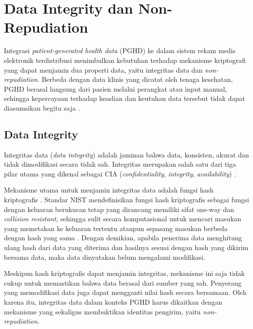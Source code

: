 \section{Data Integrity dan Non-Repudiation}\label{studi-data-integrity-non-repudiation}

Integrasi \textit{patient-generated health data} (PGHD) ke dalam sistem rekam medis elektronik terdistribusi menimbulkan kebutuhan terhadap mekanisme kriptografi yang dapat menjamin dua properti data, yaitu integritas data dan \textit{non-repudiation}.
Berbeda dengan data klinis yang dicatat oleh tenaga kesehatan, PGHD berasal langsung dari pasien melalui perangkat atau input manual, sehingga kepercayaan terhadap keaslian dan keutuhan data tersebut tidak dapat diasumsikan begitu saja \parencite{Khatiwada_Yang_Lin_Blobel_2024_PGHD_Understanding,Abdolkhani_2019_PGHD_Quality_Challenges}.

\subsection{Data Integrity}\label{studi-data-integrity}

Integritas data (\textit{data integrity}) adalah jaminan bahwa data, konsisten, akurat dan tidak dimodifikasi secara tidak sah.
Integritas merupakan salah satu dari tiga pilar utama yang dikenal sebagai CIA (\textit{confidentiality}, \textit{integrity}, \textit{availability}) \parencite{tripathi2025cia}.

Mekanisme utama untuk menjamin integritas data adalah fungsi hash kriptografis \parencite{tripathi2025cia}.
Standar NIST mendefinisikan fungsi hash kriptografis sebagai fungsi dengan keluaran berukuran tetap yang dirancang memiliki sifat one-way dan \textit{collision resistant}, sehingga sulit secara komputasional untuk mencari masukan yang memetakan ke keluaran tertentu ataupun sepasang masukan berbeda dengan hash yang sama \parencite{NIST_FIPS186-5}.
Dengan demikian, apabila penerima data menghitung ulang hash dari data yang diterima dan hasilnya sesuai dengan hash yang dikirim bersama data, maka data dinyatakan belum mengalami modifikasi.

Meskipun hash kriptografis dapat menjamin integritas, mekanisme ini saja tidak cukup untuk memastikan bahwa data berasal dari sumber yang sah.
Penyerang yang memodifikasi data juga dapat mengganti nilai hash secara bersamaan.
Oleh karena itu, integritas data dalam konteks PGHD harus dikaitkan dengan mekanisme yang sekaligus membuktikan identitas pengirim, yaitu \textit{non-repudiation}.

